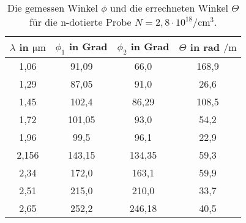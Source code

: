 \begin{table}
    \centering
    \caption{Die gemessen Winkel $\phi$ und die errechneten Winkel $\Theta$ für die n-dotierte Probe $N = 2,8 \cdot 10^{18} \si{\per\cubic\cm}$.}
    \label{tab:bla}
    \begin{tabular}{c c c c}
        \toprule
        $\lambda$ in $\si{\um}$ & $\phi_1$ in Grad  & $\phi_2$ in Grad & $\Theta$ in rad $\si{\per\meter}$ \\
        \midrule
        1,06  &  91,09  &  66,0  &  168,9  \\
        1,29  &  87,05  &  91,0  &  26,6  \\
        1,45  &  102,4  &  86,29  &  108,5  \\
        1,72  &  101,05  &  93,0  &  54,2  \\
        1,96  &  99,5  &  96,1  &  22,9  \\
        2,156  &  143,15  &  134,35  &  59,3  \\
        2,34  &  172,0  &  163,1  &  59,9  \\
        2,51  &  215,0  &  210,0  &  33,7  \\
        2,65  &  252,2  &  246,18  &  40,5  \\
        \bottomrule
    \end{tabular}
\end{table}
